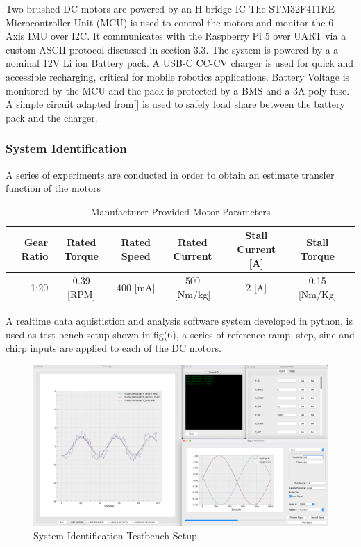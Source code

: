         Two brushed DC motors are powered by an H bridge IC 
        The STM32F411RE Microcontroller Unit (MCU) is used to control the 
        motors and monitor the 6 Axis IMU over I2C. It communicates with the 
        Raspberry Pi 5 over UART via a custom ASCII protocol discussed in section 3.3. 
        The system is powered by a a nominal 12V Li ion Battery pack. A USB-C CC-CV charger is used for quick 
        and accessible recharging, critical for mobile robotics applications. 
        Battery Voltage is monitored by the MCU and the pack is protected by a BMS and a 3A poly-fuse.
        A simple circuit adapted from[] is used to safely load share between the battery pack and the charger.

        \pagebreak{}
        \subsubsection{System Identification}
        A series of experiments are conducted in order to obtain an estimate transfer function of the motors
        
        \begin{table}[H]
            \centering
                \begin{tabular}{|r|c|c|c|c|c|c|}
                    \hline 
                    Gear Ratio & Rated Torque & Rated Speed  & Rated Current & Stall Current [A] & Stall Torque \\
                    \hline
                     1:20  & 0.39 [RPM] & 400 [mA] & 500 [Nm/kg] & 2  [A] & 0.15 [Nm/Kg] \\
                    \hline
                \end{tabular}
                \caption{Manufacturer Provided Motor Parameters}
        \end{table}
        A realtime data aquististion and analysis software system developed in python, is used as test bench setup 
        shown in fig(6), a series of reference ramp, step, sine and chirp inputs are applied to each of the DC motors.  
        \begin{figure}[H]
            \centering
            \includegraphics[height=0.45\textwidth]{SysIDMotorSetUp.png}
            \caption{System Identification Testbench Setup}
        \end{figure}
     
